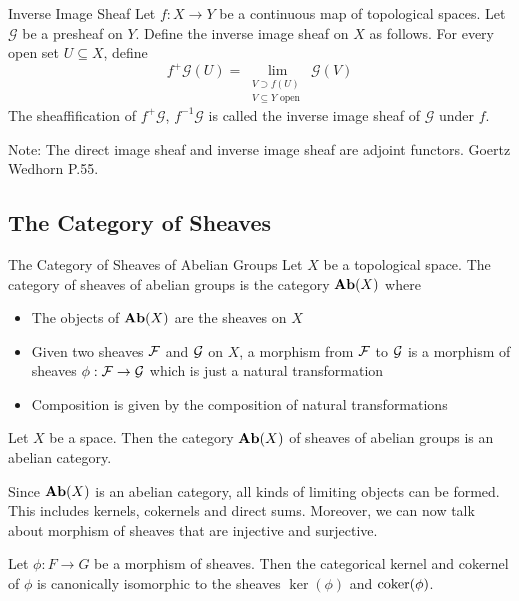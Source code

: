 \documentclass[a4paper]{article}
\begin{document}
\begin{defn}{Inverse Image Sheaf}{} Let $f:X\to Y$ be a continuous map of topological spaces. Let $\mathcal{G}$ be a presheaf on $Y$. Define the inverse image sheaf on $X$ as follows. For every open set $U\subseteq X$, define $$f^+\mathcal{G}(U)=\lim_{\substack{V\supset f(U)\\V\subseteq Y\text{ open }}}\mathcal{G}(V)$$ The sheaffification of $f^+\mathcal{G}$, $f^{-1}\mathcal{G}$ is called the inverse image sheaf of $\mathcal{G}$ under $f$. 
\end{defn}

Note: The direct image sheaf and inverse image sheaf are adjoint functors. Goertz Wedhorn P.55. 

\subsection{The Category of Sheaves}
\begin{defn}{The Category of Sheaves of Abelian Groups}{} Let $X$ be a topological space. The category of sheaves of abelian groups is the category $\bold{Ab}(X)$ where
\begin{itemize}
\item The objects of $\bold{Ab}(X)$ are the sheaves on $X$
\item Given two sheaves $\mathcal{F}$ and $\mathcal{G}$ on $X$, a morphism from $\mathcal{F}$ to $\mathcal{G}$ is a morphism of sheaves $\phi:\mathcal{F}\to\mathcal{G}$ which is just a natural transformation
\item Composition is given by the composition of natural transformations
\end{itemize}
\end{defn}

\begin{thm}{}{} Let $X$ be a space. Then the category $\bold{Ab}(X)$ of sheaves of abelian groups is an abelian category. 
\end{thm}

Since $\bold{Ab}(X)$ is an abelian category, all kinds of limiting objects can be formed. This includes kernels, cokernels and direct sums. Moreover, we can now talk about morphism of sheaves that are injective and surjective. 

\begin{lmm}{}{} Let $\phi:F\to G$ be a morphism of sheaves. Then the categorical kernel and cokernel of $\phi$ is canonically isomorphic to the sheaves $\ker(\phi)$ and $\operatorname{coker}(\phi)$. 
\end{lmm}
\end{document}

